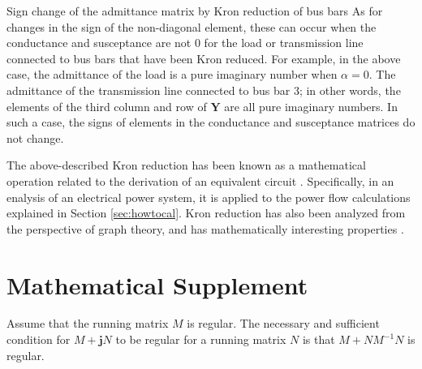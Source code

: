 \documentclass[graybox, envcountchap]{svmult}
\begin{document}
\begin{example}{Sign change of the admittance matrix by Kron reduction of bus bars}
As for changes in the sign of the non-diagonal element, these can occur when the conductance and susceptance are not 0 for the load or transmission line connected to bus bars that have been Kron reduced. For example, in the above case, the admittance of the load is a pure imaginary number when $\alpha=0$. The admittance of the transmission line connected to bus bar 3; in other words, the elements of the third column and row of $\bm{Y}$ are all pure imaginary numbers. In such a case, the signs of elements in the conductance and susceptance matrices do not change. 

\end{example}

The above-described Kron reduction has been known as a mathematical operation related to the derivation of an equivalent circuit \cite{kron1939tensor}.
Specifically, in an enalysis of an electrical power system, it is applied to the power flow calculations explained in Section \ref{sec:howtocal}.
Kron reduction has also been analyzed from the perspective of graph theory, and has mathematically interesting properties \cite{dorfler2013kron}.


%



\section*{Mathematical Supplement}
\begin{lemma}\label{lem:nonsing}
Assume that the running matrix $M$ is regular.
The necessary and sufficient condition for $M+ \bm{j} N$ to be regular for a running matrix $N$ is that $M+NM^{-1}N$ is regular.
\end{lemma}
\end{document}
